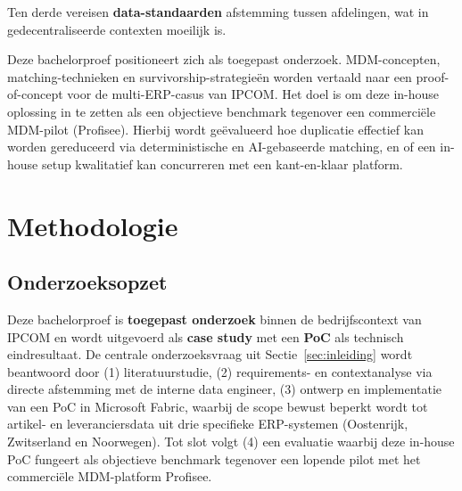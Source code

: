 Ten derde vereisen \textbf{data-standaarden} afstemming tussen afdelingen, wat in gedecentraliseerde contexten moeilijk is.

Deze bachelorproef positioneert zich als toegepast onderzoek. MDM-concepten, matching-technieken en survivorship-strategieën worden vertaald naar een proof-of-concept voor de multi-ERP-casus van IPCOM. Het doel is om deze in-house oplossing in te zetten als een objectieve benchmark tegenover een commerciële MDM-pilot (Profisee). Hierbij wordt geëvalueerd hoe duplicatie effectief kan worden gereduceerd via deterministische en AI-gebaseerde matching, en of een in-house setup kwalitatief kan concurreren met een kant-en-klaar platform.


\section{Methodologie}%
\label{sec:methodologie}

\subsection{Onderzoeksopzet}
Deze bachelorproef is \textbf{toegepast onderzoek} binnen de bedrijfscontext van IPCOM en wordt uitgevoerd als \textbf{case study} met een \textbf{PoC} als technisch eindresultaat. De centrale onderzoeksvraag uit Sectie~\ref{sec:inleiding} wordt beantwoord door (1) literatuurstudie, (2) requirements- en contextanalyse via directe afstemming met de interne data engineer, (3) ontwerp en implementatie van een PoC in Microsoft Fabric, waarbij de scope bewust beperkt wordt tot artikel- en leveranciersdata uit drie specifieke ERP-systemen (Oostenrijk, Zwitserland en Noorwegen). Tot slot volgt (4) een evaluatie waarbij deze in-house PoC fungeert als objectieve benchmark tegenover een lopende pilot met het commerciële MDM-platform Profisee.

